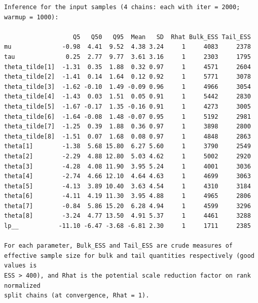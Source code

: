 \documentclass[american,]{article}
\begin{document}
\begin{verbatim}
Inference for the input samples (4 chains: each with iter = 2000; warmup = 1000):

                   Q5   Q50   Q95  Mean   SD  Rhat Bulk_ESS Tail_ESS
mu              -0.98  4.41  9.52  4.38 3.24     1     4083     2378
tau              0.25  2.77  9.77  3.61 3.16     1     2303     1795
theta_tilde[1]  -1.31  0.35  1.88  0.32 0.97     1     4571     2604
theta_tilde[2]  -1.41  0.14  1.64  0.12 0.92     1     5771     3078
theta_tilde[3]  -1.62 -0.10  1.49 -0.09 0.96     1     4966     3054
theta_tilde[4]  -1.43  0.03  1.51  0.05 0.91     1     5442     2830
theta_tilde[5]  -1.67 -0.17  1.35 -0.16 0.91     1     4273     3005
theta_tilde[6]  -1.64 -0.08  1.48 -0.07 0.95     1     5192     2981
theta_tilde[7]  -1.25  0.39  1.88  0.36 0.97     1     3898     2800
theta_tilde[8]  -1.51  0.07  1.68  0.08 0.97     1     4848     2863
theta[1]        -1.38  5.68 15.80  6.27 5.60     1     3790     2549
theta[2]        -2.29  4.88 12.80  5.03 4.62     1     5002     2920
theta[3]        -4.28  4.08 11.90  3.95 5.24     1     4001     3036
theta[4]        -2.74  4.66 12.10  4.64 4.63     1     4699     3063
theta[5]        -4.13  3.89 10.40  3.63 4.54     1     4310     3184
theta[6]        -4.11  4.19 11.30  3.95 4.88     1     4965     2806
theta[7]        -0.84  5.86 15.20  6.28 4.94     1     4599     3296
theta[8]        -3.24  4.77 13.50  4.91 5.37     1     4461     3288
lp__           -11.10 -6.47 -3.68 -6.81 2.30     1     1711     2385

For each parameter, Bulk_ESS and Tail_ESS are crude measures of 
effective sample size for bulk and tail quantities respectively (good values is 
ESS > 400), and Rhat is the potential scale reduction factor on rank normalized
split chains (at convergence, Rhat = 1).
\end{verbatim}
\end{document}
